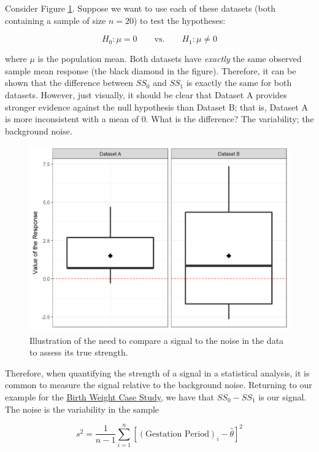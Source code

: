\documentclass[]{book}
\theoremstyle{plain}
\theoremstyle{mydefn}
\theoremstyle{myexmpl}
\theoremstyle{remark}
\begin{document}
Consider Figure \ref{fig:singleteststat-signal-to-noise}. Suppose we
want to use each of these datasets (both containing a sample of size
\(n = 20\)) to test the hypotheses:

\[H_0: \mu = 0 \qquad \text{vs.} \qquad H_1: \mu \neq 0\]

where \(\mu\) is the population mean. Both datasets have \emph{exactly}
the same observed sample mean response (the black diamond in the
figure). Therefore, it can be shown that the difference between \(SS_0\)
and \(SS_1\) is exactly the same for both datasets. However, just
visually, it should be clear that Dataset A provides stronger evidence
against the null hypothesis than Dataset B; that is, Dataset A is more
inconsistent with a mean of 0. What is the difference? The variability;
the background noise.

\begin{figure}

{\centering \includegraphics[width=0.8\linewidth]{./Images/singleteststat-signal-to-noise-1} 

}

\caption{Illustration of the need to compare a signal to the noise in the data to assess its true strength.}\label{fig:singleteststat-signal-to-noise}
\end{figure}

Therefore, when quantifying the strength of a signal in a statistical
analysis, it is common to measure the signal relative to the background
noise. Returning to our example for the
\protect\hyperlink{CaseBabies}{Birth Weight Case Study}, we have that
\(SS_0 - SS_1\) is our signal. The noise is the variability in the
sample

\[s^2 = \frac{1}{n-1}\sum_{i=1}^{n} \left[(\text{Gestation Period})_i - \widehat{\theta}\right]^2\]
\end{document}
